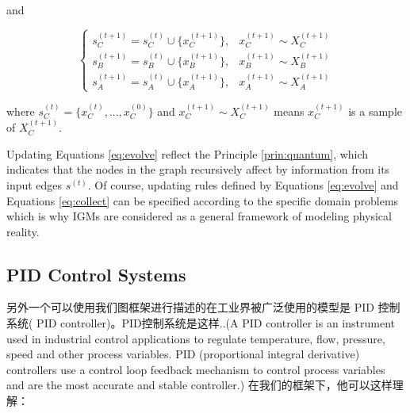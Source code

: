 \documentclass{article}
\theoremstyle{definition}
\theoremstyle{remark}
\theoremstyle{definition}
\begin{document}
\begin{CJK*}{UTF8}{gbsn}
and 

\begin{equation} \label{eq:collect}
\left\{
     \begin{array}{lr}
     s^{(t+1)}_C = s^{(t)}_C \cup \{x_C^{(t+1)}\}, & x_C^{(t+1)} \sim X_C^{(t+1)} \\
     s^{(t+1)}_B = s^{(t)}_B \cup \{x_B^{(t+1)}\}, & x_B^{(t+1)} \sim X_B^{(t+1)} \\
     s^{(t+1)}_A = s^{(t)}_A \cup \{x_A^{(t+1)}\}, & x_A^{(t+1)} \sim X_A^{(t+1)}  
     \end{array}
\right.
\end{equation}

where $s_{C}^{(t)} = \{x^{(t)}_C, ..., x^{(0)}_C\}$ and $x_C^{(t+1)} \sim X_C^{(t+1)}$ means $x_C^{(t+1)}$ is a sample of $X_C^{(t+1)}$. 

Updating Equations \ref{eq:evolve} reflect the Principle \ref{prin:quantum}, which indicates that the nodes in the graph recursively affect by information from its input edges $s^{(t)}$. Of course, updating rules defined by Equations \ref{eq:evolve} and Equations \ref{eq:collect} can be specified according to the specific domain problems which is why IGMs are considered as a general framework of modeling physical reality. 

\subsection{PID Control Systems}

另外一个可以使用我们图框架进行描述的在工业界被广泛使用的模型是 PID 控制系统( PID controller)。PID控制系统是这样..(A PID controller is an instrument used in industrial control applications to regulate temperature, flow, pressure, speed and other process variables. PID (proportional integral derivative) controllers use a control loop feedback mechanism to control process variables and are the most accurate and stable controller.)
在我们的框架下，他可以这样理解：


\begin{figure}[h]
	\begin{subfigure}[tb]{0.45\textwidth}
		\centering
\end{subfigure}
\end{figure}
\end{CJK*}
\end{document}
